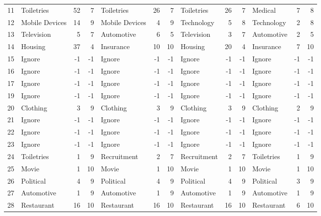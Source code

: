 \begin{figure}[htbp]
\begin{tabular}{rlrrlrrlrrlrr}
    11    & Toiletries & 52    & 7     & Toiletries & 26    & 7     & Toiletries & 26    & 7     & Medical & 7     & 8 \\
    12    & Mobile Devices & 14    & 9     & Mobile Devices & 4     & 9     & Technology & 5     & 8     & Technology & 2     & 8 \\
    13    & Television & 5     & 7     & Automotive & 6     & 5     & Television & 3     & 7     & Automotive & 2     & 5 \\
    14    & Housing & 37    & 4     & Insurance & 10    & 10    & Housing & 20    & 4     & Insurance & 7     & 10 \\
    15    & Ignore & -1    & -1    & Ignore & -1    & -1    & Ignore & -1    & -1    & Ignore & -1    & -1 \\
    16    & Ignore & -1    & -1    & Ignore & -1    & -1    & Ignore & -1    & -1    & Ignore & -1    & -1 \\
    17    & Ignore & -1    & -1    & Ignore & -1    & -1    & Ignore & -1    & -1    & Ignore & -1    & -1 \\
    19    & Ignore & -1    & -1    & Ignore & -1    & -1    & Ignore & -1    & -1    & Ignore & -1    & -1 \\
    20    & Clothing & 3     & 9     & Clothing & 3     & 9     & Clothing & 3     & 9     & Clothing & 2     & 9 \\
    21    & Ignore & -1    & -1    & Ignore & -1    & -1    & Ignore & -1    & -1    & Ignore & -1    & -1 \\
    22    & Ignore & -1    & -1    & Ignore & -1    & -1    & Ignore & -1    & -1    & Ignore & -1    & -1 \\
    23    & Ignore & -1    & -1    & Ignore & -1    & -1    & Ignore & -1    & -1    & Ignore & -1    & -1 \\
    24    & Toiletries & 1     & 9     & Recruitment & 2     & 7     & Recruitment & 2     & 7     & Toiletries & 1     & 9 \\
    25    & Movie & 1     & 10    & Movie & 1     & 10    & Movie & 1     & 10    & Movie & 1     & 10 \\
    26    & Political & 4     & 9     & Political & 4     & 9     & Political & 4     & 9     & Political & 3     & 9 \\
    27    & Automotive & 1     & 9     & Automotive & 1     & 9     & Automotive & 1     & 9     & Automotive & 1     & 9 \\
    28    & Restaurant & 16    & 10    & Restaurant & 16    & 10    & Restaurant & 16    & 10    & Restaurant & 6     & 10 \\

\end{tabular}
\end{figure}
